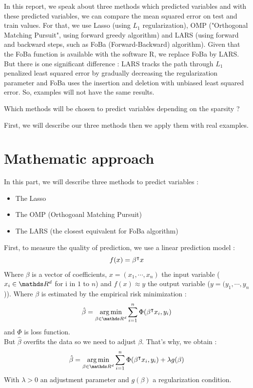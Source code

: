 \documentclass{article}
\begin{document}
\sloppy
{}


In this report, we speak about three methods which predicted variables and with these predicted variables, we can compare the mean squared error on test and train values. For that, we use Lasso (using $L_1$ regularization), OMP ("Orthogonal Matching Pursuit", using forward greedy algorithm) and LARS (using forward and backward steps, such as FoBa (Forward-Backward) algorithm). Given that the FoBa function is available with the software R, we replace FoBa by LARS. But there is one significant difference : LARS tracks the path through $L_1$ penalized least squared error by gradually decreasing the regularization parameter and FoBa uses the insertion and deletion with unbiased least squared error. So, examples will not have the same results.\\
\begin{center}
    Which methods will be chosen to predict variables depending on the sparsity ?
\end{center}
First, we will describe our three methods then we apply them with real examples.


\section{Mathematic approach}
In this part, we will describe three methods to predict variables :
\begin{itemize}
    \item The Lasso 
    \item The OMP (Orthogoanl Matching Pursuit)
    \item The LARS (the closest equivalent for FoBa algorithm)
\end{itemize}

First, to measure the quality of prediction, we use a linear prediction model :
\[ f(x)={\beta}^\intercal x\]
Where $\beta$ is a vector of coefficients, $x=(x_1, \cdots, x_n)$ the input variable ($x_i\in \R^d$ for i in $1$ to $n$) and $f(x)\approx y$ the output variable ($y=(y_1, \cdots, y_n$)).
Where $\beta$ is estimated by the empirical risk minimization : \[\hat{\beta}= \underset{\beta \in \R^d}\argmin \sum_{i=1}^n \Phi(\trans\beta x_i, y_i)\]
and $\Phi$ is loss function.\\
But $\hat{\beta}$ overfits the data so we need to adjust $\beta$. That's why, we obtain :
\[\hat{\beta} = \underset{\beta \in \R^d}{\argmin} \sum_{i=1}^n \Phi (\trans{\beta}x_i, y_i)+ \lambda g(\beta)\]
With $\lambda >0$ an adjustment parameter and $g(\beta)$ a regularization condition.
\end{document}
